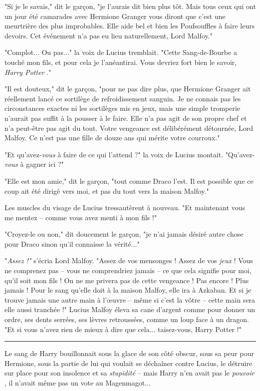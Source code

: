 "Si je le savais," dit le garçon, "je l'aurais dit bien plus tôt. Mais tous ceux qui ont un jour été camarades avec Hermione Granger vous diront que c'est une meurtrière des plus improbables. Elle aide bel et bien les Poufsouffles à faire leurs devoirs. Cet événement n'a pas eu lieu naturellement, Lord Malfoy."

"Complot... Ou pas..." la voix de Lucius tremblait. "Cette Sang-de-Bourbe a touché mon fils, et pour cela je l'anéantirai. Vous devriez fort bien le savoir, \emph{Harry Potter} ."

"Il est douteux," dit le garçon, "pour ne pas dire plus, que Hermione Granger ait réellement lancé ce sortilège de refroidissement sanguin. Je ne connais pas les circonstances exactes ni les sortilèges mis en jeux, mais une simple tromperie n'aurait pas suffit à la pousser à le faire. Elle n'a pas agit de son propre chef et n'a peut-être pas agit du tout. Votre vengeance est délibérément détournée, Lord Malfoy. Ce n'est pas une fille de douze ans qui mérite votre courroux."

"Et qu'avez-\emph{vous}  à faire de ce qui l'attend ?" la voix de Lucius montait. "Qu'avez-\emph{vous}  à gagner ici ?"

"Elle est mon amie," dit le garçon, "tout comme Draco l'est. Il est possible que ce coup ait été dirigé vers moi, et pas du tout vers la maison Malfoy."

Les muscles du visage de Lucius tressautèrent à nouveau. "Et maintenant vous me mentez – comme vous avez menti à mon fils !"

"Croyez-le ou non," dit doucement le garçon, "je n'ai jamais désiré autre chose pour Draco sinon qu'il connaisse la vérité..."

"\emph{Assez !"}  s'écria Lord Malfoy. "Assez de vos mensonges ! Assez de vos \emph{jeux } ! Vous ne comprenez pas – vous ne comprendriez jamais – ce que cela signifie pour moi, qu'il soit mon fils ! On ne me privera pas de cette vengeance ! Pas encore ! Plus jamais ! Pour le sang qu'elle doit à la maison Malfoy, elle ira à Azkaban. Et si je trouve jamais une autre main à l'œuvre – même si c'est la vôtre – cette main sera elle aussi tranchée !" Lucius Malfoy éleva sa cane d'argent comme pour donner un ordre, ses dents serrées, ses lèvres retroussées, comme un loup face à un dragon. "Et si vous n'avez rien de mieux à dire que cela... taisez-vous, Harry Potter !"
\par\noindent\rule{\textwidth}{0.4pt}
Le sang de Harry bouillonnait sous la glace de son côté obscur, sous sa peur pour Hermione, sous la partie de lui qui voulait se déchaîner contre Lucius, le détruire sur place pour son insolence et sa \emph{stupidité}  – mais Harry n'en avait pas le \emph{pouvoir} , il n'avait même pas un vote au Magenmagot...


